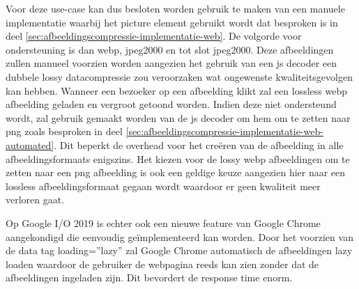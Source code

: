 Voor deze \gls{use-case} kan dus besloten worden gebruik te maken van een manuele implementatie waarbij het picture element gebruikt wordt dat besproken is in deel \ref{sec:afbeeldingscompressie-implementatie-web}. De volgorde voor ondersteuning is dan \gls{webp}, \gls{jpeg2000} en tot slot \gls{jpeg2000}. Deze afbeeldingen zullen manueel voorzien worden aangezien het gebruik van een \gls{js} \gls{decoder} een dubbele \gls{lossy} \gls{datacompressie} zou veroorzaken wat ongewenste kwaliteitsgevolgen kan hebben. Wanneer een bezoeker op een afbeelding klikt zal een \gls{lossless} \gls{webp} afbeelding geladen en vergroot getoond worden. Indien deze niet ondersteund wordt, zal gebruik gemaakt worden van de \gls{js} \gls{decoder} om hem om te zetten naar \gls{png} zoals besproken in deel \ref{sec:afbeeldingscompressie-implementatie-web-automated}. Dit beperkt de overhead voor het creëren van de afbeelding in alle \glspl{afbeeldingsformaat} enigszins. Het kiezen voor de \gls{lossy} \gls{webp} afbeeldingen om te zetten naar een \gls{png} afbeelding is ook een geldige keuze aangezien hier naar een \gls{lossless} \gls{afbeeldingsformaat} gegaan wordt waardoor er geen kwaliteit meer verloren gaat.

Op Google I/O 2019 is echter ook een nieuwe feature van Google Chrome aangekondigd die eenvoudig geïmplementeerd kan worden. Door het voorzien van de data tag loading=''lazy'' zal Google Chrome automatisch de afbeeldingen lazy loaden waardoor de gebruiker de webpagina reeds kan zien zonder dat de afbeeldingen ingeladen zijn. Dit bevordert de response time enorm.